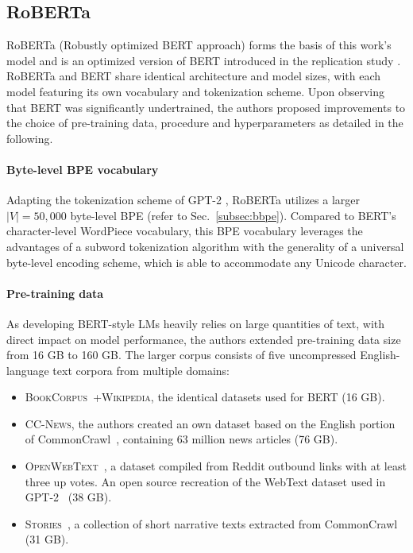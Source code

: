 \subsection{RoBERTa} \label{sec:roberta} 

RoBERTa (Robustly optimized BERT approach) forms the basis of this work's model
and is an optimized version of BERT introduced in the replication study
\cite{liu2019roberta}. RoBERTa and BERT share identical architecture and model
sizes, with each model featuring its own vocabulary and tokenization scheme.
Upon observing that BERT was significantly undertrained, the authors proposed
improvements to the choice of pre-training data, procedure and hyperparameters
as detailed in the following.

\paragraph{Byte-level BPE vocabulary} Adapting the tokenization scheme of GPT-2
\cite{radford2019gpt2}, RoBERTa utilizes a larger $|V| = 50,000$ byte-level BPE
(refer to Sec.~\ref{subsec:bbpe}). Compared to BERT's character-level WordPiece
vocabulary, this BPE vocabulary leverages the advantages of a subword
tokenization algorithm with the generality of a universal byte-level encoding
scheme, which is able to accommodate any Unicode character.

\paragraph{Pre-training data} As developing BERT-style LMs heavily relies on
large quantities of text, with direct impact on model performance, the authors
extended pre-training data size from 16 GB to 160 GB. The larger corpus consists
of five uncompressed English-language text corpora from multiple domains:

\begin{itemize}
    \item \textsc{BookCorpus}~\cite{zhu2015aligning}+\textsc{Wikipedia}, the
    identical datasets used for BERT (16 GB).
    \item \textsc{CC-News}, the authors created an own dataset based on the
    English portion of CommonCrawl~\cite{nagel2016common}, containing 63 million
    news articles (76 GB).
    \item \textsc{OpenWebText}~\cite{gokaslan2019OpenWeb}, a dataset compiled
    from Reddit outbound links with at least three up votes. An open source
    recreation of the WebText dataset used in GPT-2~\cite{radford2019gpt2} (38
    GB).
    \item \textsc{Stories}~\cite{trinh2018simple}, a collection of short
    narrative texts extracted from CommonCrawl~\cite{nagel2016common} (31 GB).
\end{itemize}

